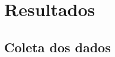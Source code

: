 \documentclass{beamer}
\begin{document}

\section{Resultados}
\subsection{Coleta dos dados}
\end{document}
